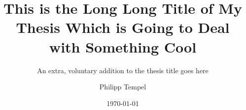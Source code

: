 \documentclass[%
  draft,%
  ngerman,%
  english,%
]{iswdctrt}
\author{Philipp Tempel}
\date{\today}
\title{This is the Long Long Title of My Thesis Which is Going to Deal with Something Cool}
\subtitle{An extra, voluntary addition to the thesis title goes here}
\begin{document}
\frontmatter



\maketitle



\begin{otherlanguage}{ngerman}
 \maketitle
\end{otherlanguage}



\begin{abstract}
  \Blindtext[3]
  
\end{abstract}



\begin{otherlanguage}{ngerman}
  \begin{abstract}
    \Blindtext[3]
       
  \end{abstract}
\end{otherlanguage}



\end{document}
